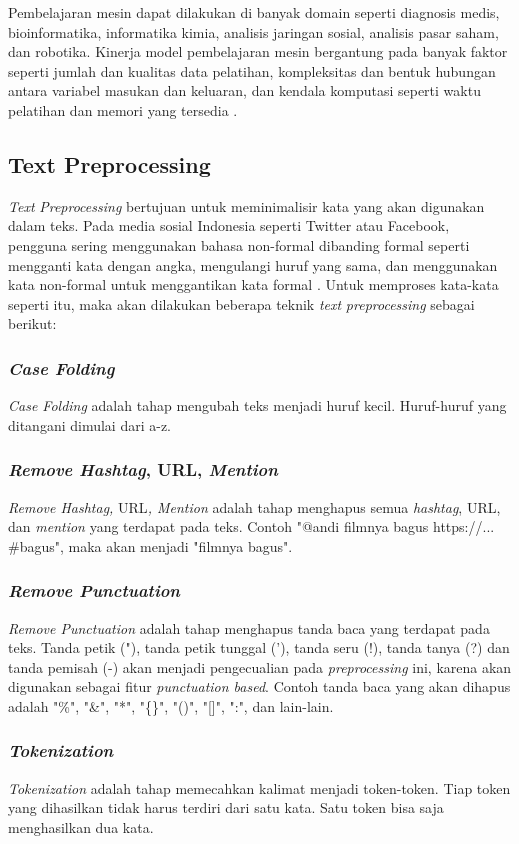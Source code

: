 Pembelajaran mesin dapat dilakukan di banyak domain seperti diagnosis 
medis, bioinformatika, informatika kimia, analisis jaringan sosial, 
analisis pasar saham, dan robotika. Kinerja model pembelajaran mesin 
bergantung pada banyak faktor seperti jumlah dan kualitas data 
pelatihan, kompleksitas dan bentuk hubungan antara variabel masukan dan 
keluaran, dan kendala komputasi seperti waktu pelatihan dan memori yang 
tersedia \cite{11}.

\subsection{Text Preprocessing}
\textit{Text} \textit{Preprocessing} bertujuan untuk meminimalisir 
kata yang akan digunakan dalam teks. Pada media sosial Indonesia seperti 
Twitter atau Facebook, pengguna sering menggunakan bahasa non-formal 
dibanding formal seperti mengganti kata dengan angka, mengulangi huruf 
yang sama, dan menggunakan kata non-formal untuk menggantikan kata 
formal \cite{5}. Untuk memproses kata-kata seperti itu, maka akan 
dilakukan beberapa teknik \textit{text} \textit{preprocessing }
sebagai berikut: 
\subsubsection{\textit{Case Folding}}
\textit{Case Folding }adalah tahap mengubah teks menjadi huruf kecil. 
Huruf-huruf yang ditangani dimulai dari a-z.
\subsubsection{\textit{Remove Hashtag}, URL, \textit{Mention}}
\textit{Remove Hashtag, }URL\textit{, Mention }adalah tahap 
menghapus semua \textit{hashtag}, URL, dan \textit{mention }yang 
terdapat pada teks. Contoh "@andi filmnya bagus https://... \#bagus", 
maka akan menjadi "filmnya bagus".
\subsubsection{\textit{Remove Punctuation}}
\textit{Remove Punctuation }adalah tahap menghapus tanda baca yang 
terdapat pada teks. Tanda petik ("), tanda petik tunggal ('), tanda 
seru (!), tanda tanya (?) dan tanda pemisah (-) akan menjadi 
pengecualian pada \textit{preprocessing }ini, karena akan digunakan 
sebagai fitur \textit{punctuation based}. Contoh tanda baca yang akan 
dihapus adalah "\%", "\&", "*", "\{\}", "()", "[]", ":", dan lain-lain.
\subsubsection{\textit{Tokenization}}
\textit{Tokenization} adalah tahap memecahkan kalimat menjadi 
token-token. Tiap token yang dihasilkan tidak harus terdiri dari satu 
kata. Satu token bisa saja menghasilkan dua kata. 
